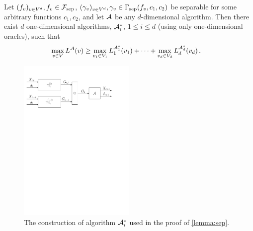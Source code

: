 \begin{lemma}
\label{lemma:sep}
Let %
$(f_v)_{v\in V^d}, f_v \in \mathcal{F}_{\mathrm{sep}}$, $(\gamma_v)_{v\in V^d}, \gamma_v \in \Gamma_{\mathrm{sep}}(f_v,c_1,c_2)$ be separable for some arbitrary functions $c_1,c_2$, and let $\mathcal{A}$ be any $d$-dimensional algorithm. Then there exist  $d$ one-dimensional algorithms, $\mathcal{A}_i^*$, $1\le i \le d$ (using only one-dimensional oracles),
such that 
\begin{align}
\label{eq:onedimlb}
&\max_{v\in V} L^{\mathcal{A}}(v) 
\ge   \max_{v_1\in V_1} L_1^{\mathcal{A}_1^*}(v_1) + \dots + \max_{v_d\in V_d} L_d^{\mathcal{A}^*_d}(v_d)\,.
\end{align}
\end{lemma}
\begin{figure}
\begin{center}
	\includegraphics[width=0.5\textwidth]{../figs/ddimto1dim_reduction} %
\end{center}
\caption{The construction of algorithm $\mathcal{A}_i^*$ used in the proof of \cref{lemma:sep}.}
\label{fig:sepalgconstruction}
\end{figure}
